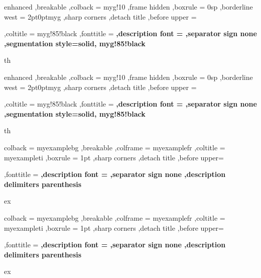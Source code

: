 
{%
	enhanced
	,breakable
	,colback = myg!10
	,frame hidden
	,boxrule = 0sp
	,borderline west = {2pt}{0pt}{myg}
	,sharp corners
	,detach title
	,before upper = \tcbtitle\par\smallskip
	,coltitle = myg!85!black
	,fonttitle = \bfseries\sffamily
	,description font = \mdseries
	,separator sign none
	,segmentation style={solid, myg!85!black}
}
{th}


{%
	enhanced
	,breakable
	,colback = myg!10
	,frame hidden
	,boxrule = 0sp
	,borderline west = {2pt}{0pt}{myg}
	,sharp corners
	,detach title
	,before upper = \tcbtitle\par\smallskip
	,coltitle = myg!85!black
	,fonttitle = \bfseries\sffamily
	,description font = \mdseries
	,separator sign none
	,segmentation style={solid, myg!85!black}
}
{th}


{%
	colback = myexamplebg
	,breakable
	,colframe = myexamplefr
	,coltitle = myexampleti
	,boxrule = 1pt
	,sharp corners
	,detach title
	,before upper=\tcbtitle\par\smallskip
	,fonttitle = \bfseries
	,description font = \mdseries
	,separator sign none
	,description delimiters parenthesis
}
{ex}

{%
	colback = myexamplebg
	,breakable
	,colframe = myexamplefr
	,coltitle = myexampleti
	,boxrule = 1pt
	,sharp corners
	,detach title
	,before upper=\tcbtitle\par\smallskip
	,fonttitle = \bfseries
	,description font = \mdseries
	,separator sign none
	,description delimiters parenthesis
}
{ex}


